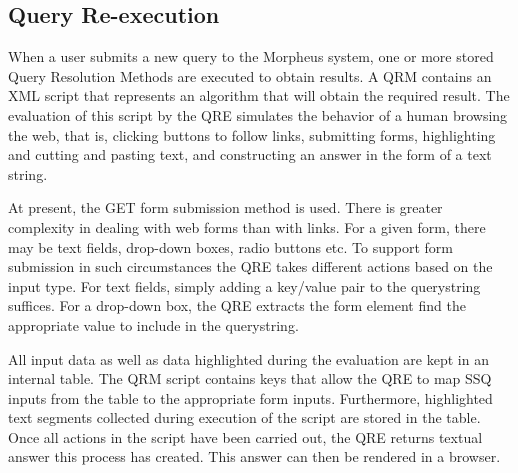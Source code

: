 \subsection{Query Re-execution}
When a user submits a new query to the Morpheus system, one or more
stored Query Resolution Methods are executed to obtain results. A QRM
contains an XML script that represents an algorithm that will obtain
the required result.  The evaluation of this script by the QRE
simulates the behavior of a human browsing the web, that is, clicking
buttons to follow links, submitting forms, highlighting and cutting
and pasting text, and constructing an answer in the form of a text
string.

At present, the GET form submission method is used.  There is greater
complexity in dealing with web forms than with links. For a given
form, there may be text fields, drop-down boxes, radio buttons etc.
To support form submission in such circumstances the QRE takes
different actions based on the input type. For text fields, simply
adding a key/value pair to the querystring suffices. For a drop-down
box, the QRE extracts the form element find the appropriate value to
include in the querystring.

All input data as well as data highlighted during the evaluation are
kept in an internal table. The QRM script contains keys that allow the
QRE to map SSQ inputs from the table to the appropriate form
inputs. Furthermore, highlighted text segments collected during
execution of the script are stored in the table.  Once all actions in
the script have been carried out, the QRE returns textual answer this
process has created. This answer can then be rendered in a
browser.
